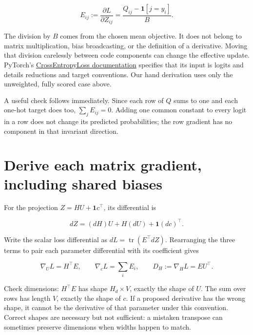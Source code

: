 \begin{equation}
E_{ij}:=\frac{\partial L}{\partial Z_{ij}}
=\frac{Q_{ij}-\mathbf1[j=y_i]}B.
\end{equation}

The division by \(B\) comes from the chosen mean objective. It does not
belong to matrix multiplication, bias broadcasting, or the definition of
a derivative. Moving that division carelessly between code components
can change the effective update. PyTorch's
\href{https://docs.pytorch.org/docs/2.10/generated/torch.nn.CrossEntropyLoss.html}{CrossEntropyLoss
documentation} specifies that its input is logits and details reductions
and target conventions. Our hand derivation uses only the unweighted,
fully scored case above.

A useful check follows immediately. Since each row of \(Q\) sums to one
and each one-hot target does too, \(\sum_jE_{ij}=0\). Adding one common
constant to every logit in a row does not change its predicted
probabilities; the row gradient has no component in that invariant
direction.

\section{Derive each matrix gradient, including shared
biases}\label{derive-each-matrix-gradient-including-shared-biases}

For the projection \(Z=HU+\mathbf1c^\top\), its differential is

\begin{equation}
dZ=(dH)U+H(dU)+\mathbf1(dc)^\top.
\end{equation}

Write the scalar loss differential as
\(dL=\operatorname{tr}(E^\top dZ)\). Rearranging the three terms to pair
each parameter differential with its coefficient gives

\begin{equation}
\nabla_U L=H^\top E,\qquad
\nabla_c L=\sum_i E_i,\qquad
D_H:=\nabla_HL=EU^\top.
\end{equation}

Check dimensions: \(H^\top E\) has shape \(H_d\times V\), exactly the
shape of \(U\). The sum over rows has length \(V\), exactly the shape of
\(c\). If a proposed derivative has the wrong shape, it cannot be the
derivative of that parameter under this convention. Correct shapes are
necessary but not sufficient: a mistaken transpose can sometimes
preserve dimensions when widths happen to match.

